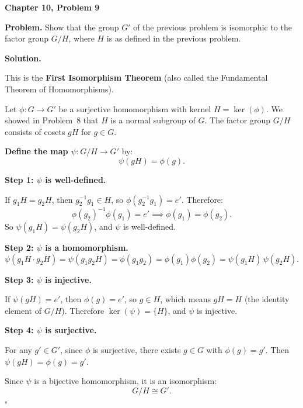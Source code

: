\documentclass[12pt]{article}
\begin{document}
\begin{center}
{\Large\bfseries Chapter 10, Problem 9}
\end{center}

\noindent\textbf{Problem.} Show that the group $G'$ of the previous problem is isomorphic to the factor group $G/H$, where $H$ is as defined in the previous problem.

\bigskip
\noindent\textbf{Solution.}

This is the \textbf{First Isomorphism Theorem} (also called the Fundamental Theorem of Homomorphisms).

Let $\phi: G \to G'$ be a surjective homomorphism with kernel $H = \ker(\phi)$. We showed in Problem~8 that $H$ is a normal subgroup of $G$. The factor group $G/H$ consists of cosets $gH$ for $g \in G$.

\medskip
\noindent\textbf{Define the map $\psi: G/H \to G'$} by:
\[
\psi(gH) = \phi(g).
\]

\noindent\textbf{Step 1: $\psi$ is well-defined.}

If $g_1 H = g_2 H$, then $g_2^{-1}g_1 \in H$, so $\phi(g_2^{-1}g_1) = e'$. Therefore:
\[
\phi(g_2)^{-1}\phi(g_1) = e' \implies \phi(g_1) = \phi(g_2).
\]
So $\psi(g_1 H) = \psi(g_2 H)$, and $\psi$ is well-defined.

\medskip
\noindent\textbf{Step 2: $\psi$ is a homomorphism.}
\[
\psi(g_1 H \cdot g_2 H) = \psi(g_1 g_2 H) = \phi(g_1 g_2) = \phi(g_1)\phi(g_2) = \psi(g_1 H)\,\psi(g_2 H).
\]

\medskip
\noindent\textbf{Step 3: $\psi$ is injective.}

If $\psi(gH) = e'$, then $\phi(g) = e'$, so $g \in H$, which means $gH = H$ (the identity element of $G/H$). Therefore $\ker(\psi) = \{H\}$, and $\psi$ is injective.

\medskip
\noindent\textbf{Step 4: $\psi$ is surjective.}

For any $g' \in G'$, since $\phi$ is surjective, there exists $g \in G$ with $\phi(g) = g'$. Then $\psi(gH) = \phi(g) = g'$.

\medskip
Since $\psi$ is a bijective homomorphism, it is an isomorphism:
\[
\boxed{G/H \cong G'.}
\]
$\square$
\end{document}
